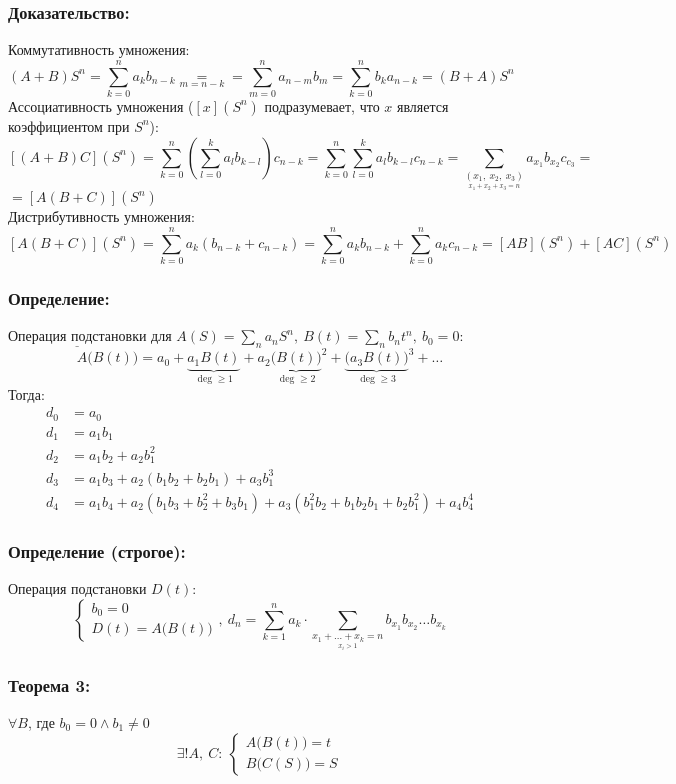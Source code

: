 \documentclass[12pt, letterpaper, twoside]{article}
\newcommand{\Underl}[1]{$\underline{\text{#1}}$}
\begin{document}
\subsubsection*{Доказательство:}
    Коммутативность умножения:
    \[(A + B)S^n = \sum_{k = 0}^{n} a_k b_{n - k} \underset{m = n - k}{=} = \sum_{m = 0}^{n}a_{n - m}b_m = \sum_{k = 0}^{n} b_k a_{n - k} = (B + A)S^n\]
    Ассоциативность умножения ($[x](S^n)$ подразумевает, что $x$ является коэффициентом при $S^n$):
    \[[(A + B)C](S^n) = \sum_{k = 0}^{n} \left( \sum_{l = 0}^k a_l b_{k - l} \right) c_{n - k} = \sum_{k =0}^{n}\sum_{l = 0}^{k} a_l b_{k - l} c_{n - k} = \sum_{\underset{x_1 + x_2 + x_3 = n}{(x_1,\ x_2,\ x_3)}} a_{x_1} b_{x_2} c_{c_3} =\]
    $=[A(B + C)](S^n)$\\
    Дистрибутивность умножения:
    \[[A(B + C)](S^n) = \sum_{k =0}^{n} a_k(b_{n - k} + c_{n - k}) = \sum_{k = 0}^n a_{k}b_{n - k} + \sum_{k = 0}^n a_k c_{n - k} = [AB](S^n) + [AC](S^n)\]
\subsubsection*{Определение:}
\Underl{Операция подстановки} для $A(S) = \sum_{n} a_n S^n,\ B(t) = \sum_n b_n t^n,\ b_0 = 0$:
\[A\big( B(t)\big) = a_0 + \underset{\deg \geq 1}{\underbrace{a_1 B(t)}} + a_2 \underset{\deg \geq 2}{\underbrace{\big(B(t)\big)}}^2 + \underset{\deg \geq 3}{\underbrace{\big(a_3 B(t)\big)}}^3 + \dots\]
Тогда:
\begin{align*}
    d_0 &= a_0\\
    d_1 &= a_1 b_1\\
    d_2 &= a_1 b_2 + a_2 b_1^2\\
    d_3 &= a_1 b_3 + a_2 (b_1 b_2 + b_2 b_1) + a_3 b_1^3\\
    d_4 &= a_1 b_4 + a_2 (b_1 b_3 + b_2^2 + b_3 b_1) + a_3(b_1^2 b_2 + b_1 b_2 b_1 + b_2 b_1^2) + a_4 b_4^4
\end{align*}
\subsubsection*{Определение (строгое):}
    Операция подстановки $D(t)$:
    \[\begin{cases}
        b_0 = 0\\
        D(t) = A\big(B(t)\big)
    \end{cases},\ d_n = \sum_{k = 1}^{n}a_k\cdot \sum_{\underset{x_i > 1}{x_1 +\dots + x_k = n}} b_{x_1} b_{x_2} \dots b_{x_k}\]
    \subsubsection*{Теорема 3:}
    $\forall B$, где $b_0 = 0\wedge b_1 \neq 0$
    \[\exists! A,\ C:\ \begin{cases}
        A\big( B(t) \big) = t\\
        B\big( C(S) \big) = S
    \end{cases}  \]
\end{document}

